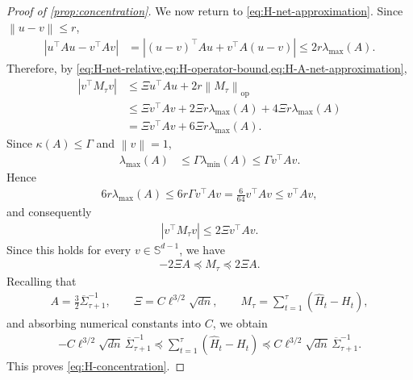 \documentclass[11pt]{article}
\newcommand{\op}{\mathrm{op}}
\newcommand{\1}{\mathbf 1}
\newcommand{\norm}[1]{\left\lVert #1\right\rVert}
\begin{document}
\begin{proof}[Proof of \cref{prop:concentration}]
    We now return to \eqref{eq:H-net-approximation}. Since
    $\norm{u-v}\leq r$,
    \begin{align}
        |u^\top Au-v^\top Av|
         & =
        \left|
        (u-v)^\top Au
        +
        v^\top A(u-v)
        \right|
        \leq
        2r\lambda_{\max}(A).
        \label{eq:H-A-net-approximation}
    \end{align}
    Therefore, by
    \cref{eq:H-net-relative,eq:H-operator-bound,eq:H-A-net-approximation},
    \begin{align}
        |v^\top M_\tau v|
         & \leq
        \Xi u^\top Au
        +
        2r\norm{M_\tau}_{\op}   \\
         & \leq
        \Xi v^\top Av
        +
        2\Xi r\lambda_{\max}(A)
        +
        4\Xi r\lambda_{\max}(A) \\
         & =
        \Xi v^\top Av
        +
        6\Xi r\lambda_{\max}(A).
    \end{align}
    Since $\kappa(A)\leq\Gamma$ and $\norm{v}=1$,
    \begin{align}
        \lambda_{\max}(A)
         & \leq
        \Gamma\lambda_{\min}(A)
        \leq
        \Gamma v^\top Av.
    \end{align}
    Hence
    \begin{align}
        6r\lambda_{\max}(A)
        \leq
        6r\Gamma v^\top Av
        =
        \frac{6}{64}v^\top Av
        \leq
        v^\top Av,
    \end{align}
    and consequently
    \begin{align}
        |v^\top M_\tau v|
        \leq
        2\Xi v^\top Av.
    \end{align}
    Since this holds for every $v\in\mathbb S^{d-1}$, we have
    \begin{align}
        -2\Xi A
        \preceq
        M_\tau
        \preceq
        2\Xi A.
    \end{align}
    Recalling that
    \begin{align}
        A=\frac32\overline\Sigma_{\tau+1}^{-1},
        \qquad
        \Xi =C\ell^{3/2}\sqrt{dn},
        \qquad
        M_\tau=\sum_{t=1}^{\tau}(\widehat H_t-H_t),
    \end{align}
    and absorbing numerical constants into $C$, we obtain
    \begin{align}
        -C\ell^{3/2}\sqrt{dn}\,
        \overline\Sigma_{\tau+1}^{-1}
        \preceq
        \sum_{t=1}^{\tau}(\widehat H_t-H_t)
        \preceq
        C\ell^{3/2}\sqrt{dn}\,
        \overline\Sigma_{\tau+1}^{-1}.
    \end{align}
    This proves \eqref{eq:H-concentration}.


\end{proof}
\end{document}
